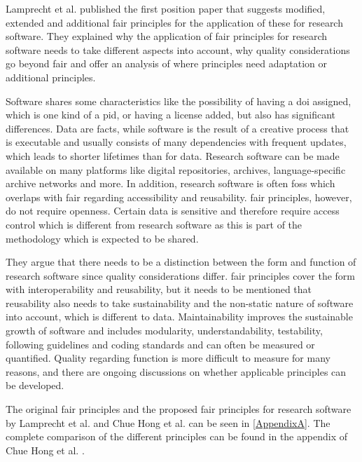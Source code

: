 Lamprecht et al. \cite{lamprecht_towards_2020} published the first position paper that suggests modified, extended and additional \acrshort{fair} principles for the application of these for research software. They explained why the application of \acrshort{fair} principles for research software needs to take different aspects into account, why quality considerations go beyond \acrshort{fair} and offer an analysis of where principles need adaptation or additional principles. 

Software shares some characteristics like the possibility of having a \acrfull{doi} assigned, which is one kind of a \acrshort{pid}, or having a license added, but also has significant differences. Data are facts, while software is the result of a creative process that is executable and usually consists of many dependencies with frequent updates, which leads to shorter lifetimes than for data. Research software can be made available on many platforms like digital repositories, archives, language-specific archive networks and more. 
In addition, research software is often \acrshort{foss} which overlaps with \acrshort{fair} regarding accessibility and reusability. \acrshort{fair} principles, however, do not require openness. Certain data is sensitive and therefore require access control which is different from research software as this is part of the methodology which is expected to be shared.

They argue that there needs to be a distinction between the form and function of research software since quality considerations differ. \acrshort{fair} principles cover the form with interoperability and reusability, but it needs to be mentioned that reusability also needs to take sustainability and the non-static nature of software into account, which is different to data. Maintainability improves the sustainable growth of software and includes modularity, understandability, testability, following guidelines and coding standards and can often be measured or quantified. Quality regarding function is more difficult to measure for many reasons, and there are ongoing discussions on whether applicable principles can be developed.

The original \acrshort{fair} principles and the proposed \acrshort{fair} principles for research software by Lamprecht et al. and Chue Hong et al. \cite{chue_hong_fair_2022} can be seen in \autoref{AppendixA}. The complete comparison of the different principles can be found in the appendix of Chue Hong et al. \cite{chue_hong_fair_2022}. 

